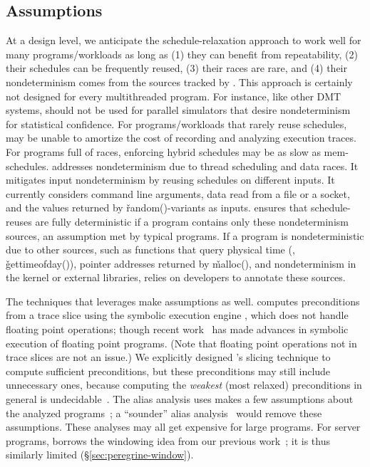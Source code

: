 \subsection{Assumptions} \label{sec:peregrine-limitations}

At a design level, we anticipate the schedule-relaxation approach to work
well for many programs/workloads as long as (1) they can benefit from
repeatability, (2) their schedules can be frequently reused, (3) their
races are rare, and (4) their nondeterminism comes from the sources
tracked by \peregrine.  This approach is certainly not designed for every
multithreaded program. For instance, like other DMT systems, \peregrine should
not be used for parallel simulators that desire nondeterminism for
statistical confidence.  For programs/workloads that rarely reuse
schedules, \peregrine may be unable to amortize the cost of recording and
analyzing execution traces.  For programs full of races, enforcing hybrid
schedules may be as slow as mem-schedules.  \peregrine addresses nondeterminism
due to thread scheduling and data races.  It mitigates input
nondeterminism by reusing schedules on different inputs.  It currently
considers command line arguments, data read from a file or a socket, and
the values returned by \v{random()}-variants as inputs.  \peregrine ensures that
schedule-reuses are fully deterministic if a program contains only these
nondeterminism sources, an assumption met by typical programs.  If a
program is nondeterministic due to other sources, such as functions that
query physical time (\eg, \v{gettimeofday()}), pointer addresses returned
by \v{malloc()}, and nondeterminism in the kernel or external libraries,
\peregrine relies on developers to annotate these sources.


The techniques that \peregrine leverages make assumptions as well.
\peregrine computes preconditions from a trace slice using the symbolic
execution engine \klee, which does not handle floating point operations;
though recent work~\cite{klee-fp} has made advances in symbolic execution
of floating point programs.  (Note
that floating point operations not in trace slices are not an issue.)  We
explicitly designed \peregrine's slicing technique to compute sufficient
preconditions, but these preconditions may still include unnecessary ones,
because computing the \emph{weakest} (most relaxed) preconditions in general is
undecidable~\cite{aho:dragon:06}.  The alias analysis \peregrine uses makes a
few assumptions about the analyzed programs~\cite{alias:icse05};
a ``sounder'' alias analysis~\cite{alias:fse06} would remove these
assumptions.  These analyses may all get expensive for large
programs.  For server programs, \peregrine borrows the
windowing idea from our previous work~\cite{cui:tern:osdi10}; it is thus
similarly limited (\S\ref{sec:peregrine-window}).

